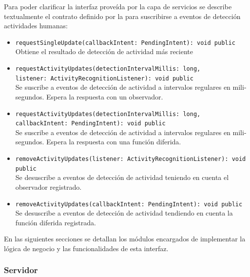 Para poder clarificar la interfaz proveída por la capa de servicios
se describe textualmente el contrato definido por la  para
suscribirse a eventos de detección actividades humanas:
\begin{itemize}
\item \texttt{\footnotesize{}requestSingleUpdate(callbackIntent: PendingIntent): void
public} \\
Obtiene el resultado de detección de actividad más reciente 
\item \texttt{\footnotesize{}requestActivityUpdates(detectionIntervalMillis: long,
}~\\
\texttt{\footnotesize{}listener: ActivityRecognitionListener): void
public}\\
Se suscribe a eventos de detección de actividad a intervalos regulares
en mili-segundos. Espera la respuesta con un observador.
\item \texttt{\footnotesize{}requestActivityUpdates(detectionIntervalMillis: long,
}~\\
\texttt{\footnotesize{}callbackIntent: PendingIntent): void public}
\\
Se suscribe a eventos de detección de actividad a intervalos regulares
en mili-segundos. Espera la respuesta con una función diferida.
\item \texttt{\footnotesize{}removeActivityUpdates(listener: ActivityRecognitionListener): void
public} \\
Se desuscribe a eventos de detección de actividad teniendo en cuenta
el observador registrado.
\item \texttt{\footnotesize{}removeActivityUpdates(callbackIntent: PendingIntent): void
public}\\
Se desuscribe a eventos de detección de actividad tendiendo en cuenta
la función diferida registrada.
\end{itemize}
En las siguientes secciones se detallan los módulos encargados de
implementar la lógica de negocio y las funcionalidades de esta interfaz.

\subsubsection{Servidor}

